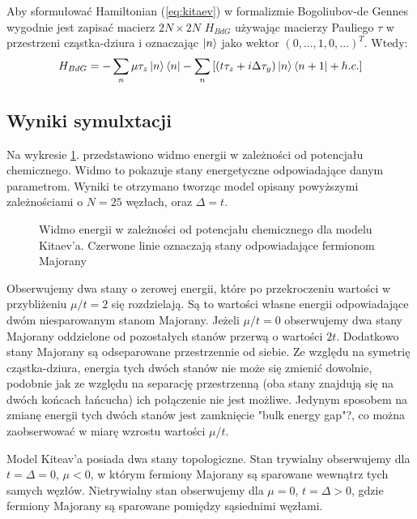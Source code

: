 \documentclass[a4paper, 12pt]{article}
\begin{document}
Aby sformułować Hamiltonian (\ref{eq:kitaev}) w formalizmie Bogoliubov-de Gennes wygodnie jest zapisać macierz $2N \times 2N$ $H_{BdG}$ używając macierzy Pauliego $\tau$ w przestrzeni cząstka-dziura i oznaczając $\ket{n}$ jako wektor $(0,...,1,0,...)^{T}$. Wtedy:
\begin{equation}
    H_{BdG} = -\sum_n \mu \tau_z \ket{n} \bra{n} - \sum_n \left[ (t\tau_z + i\Delta\tau_y) \ket{n} \bra{n+1} + h.c.\right]
\end{equation}

\subsection{Wyniki symulxtacji}
Na wykresie \ref{fig:kitaev_plot}. przedstawiono widmo energii w zależności od potencjału chemicznego. Widmo to pokazuje stany energetyczne odpowiadające danym parametrom. Wyniki te otrzymano tworząc model opisany powyższymi zależnościami o $N = 25$ węzłach, oraz $\Delta = t$.

\begin{figure}[h!]
    \centering
    \fontsize{8}{10}\selectfont %
    \resizebox{1.0\textwidth}{!}{}
    \caption{Widmo energii w zależności od potencjału chemicznego dla modelu Kitaev'a. Czerwone linie oznaczają stany odpowiadające fermionom Majorany}
    \label{fig:kitaev_plot}
\end{figure}

Obserwujemy dwa stany o zerowej energii, które po przekroczeniu wartości w przybliżeniu $\mu/t = 2$ się rozdzielają. Są to wartości własne energii odpowiadające dwóm niesparowanym stanom Majorany. Jeżeli $\mu/t=0$ obserwujemy dwa stany Majorany oddzielone od pozostałych stanów przerwą o wartości $2t$. Dodatkowo stany Majorany są odseparowane przestrzennie od siebie. Ze względu na symetrię cząstka-dziura, energia tych dwóch stanów nie może się zmienić dowolnie, podobnie jak ze względu na separację przestrzenną (oba stany znajdują się na dwóch końcach łańcucha) ich połączenie nie jest możliwe. Jedynym sposobem na zmianę energii tych dwóch stanów jest zamknięcie "bulk energy gap"?, co można zaobserwować w miarę wzrostu wartości $\mu/t$.

Model Kiteav'a posiada dwa stany topologiczne. Stan trywialny obserwujemy dla $t=\Delta = 0$, $\mu <0$, w którym fermiony Majorany są sparowane wewnątrz tych samych węzłów. Nietrywialny stan obserwujemy dla $\mu = 0$, $t=\Delta > 0$, gdzie fermiony Majorany są sparowane pomiędzy sąsiednimi węzłami.
\end{document}
